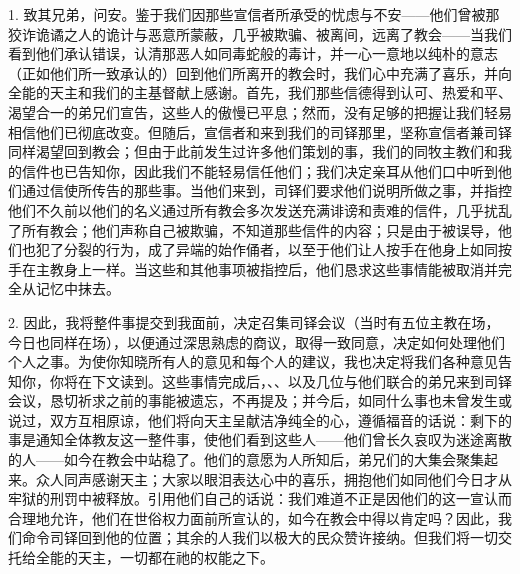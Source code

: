 \par

1. 致其兄弟，问安。鉴于我们因那些宣信者所承受的忧虑与不安——他们曾被那狡诈诡谲之人的诡计与恶意所蒙蔽，几乎被欺骗、被离间，远离了教会——当我们看到他们承认错误，认清那恶人如同毒蛇般的毒计，并一心一意地以纯朴的意志（正如他们所一致承认的）回到他们所离开的教会时，我们心中充满了喜乐，并向全能的天主和我们的主基督献上感谢。首先，我们那些信德得到认可、热爱和平、渴望合一的弟兄们宣告，这些人的傲慢已平息；然而，没有足够的把握让我们轻易相信他们已彻底改变。但随后，宣信者和来到我们的司铎那里，坚称宣信者兼司铎同样渴望回到教会；但由于此前发生过许多他们策划的事，我们的同牧主教们和我的信件也已告知你，因此我们不能轻易信任他们；我们决定亲耳从他们口中听到他们通过信使所传告的那些事。当他们来到，司铎们要求他们说明所做之事，并指控他们不久前以他们的名义通过所有教会多次发送充满诽谤和责难的信件，几乎扰乱了所有教会；他们声称自己被欺骗，不知道那些信件的内容；只是由于被误导，他们也犯了分裂的行为，成了异端的始作俑者，以至于他们让人按手在他身上如同按手在主教身上一样。当这些和其他事项被指控后，他们恳求这些事情能被取消并完全从记忆中抹去。\par

2. 因此，我将整件事提交到我面前，决定召集司铎会议（当时有五位主教在场，今日也同样在场），以便通过深思熟虑的商议，取得一致同意，决定如何处理他们个人之事。为使你知晓所有人的意见和每个人的建议，我也决定将我们各种意见告知你，你将在下文读到。这些事情完成后，、、以及几位与他们联合的弟兄来到司铎会议，恳切祈求之前的事能被遗忘，不再提及；并今后，如同什么事也未曾发生或说过，双方互相原谅，他们将向天主呈献洁净纯全的心，遵循福音的话说：剩下的事是通知全体教友这一整件事，使他们看到这些人——他们曾长久哀叹为迷途离散的人——如今在教会中站稳了。他们的意愿为人所知后，弟兄们的大集会聚集起来。众人同声感谢天主；大家以眼泪表达心中的喜乐，拥抱他们如同他们今日才从牢狱的刑罚中被释放。引用他们自己的话说：我们难道不正是因他们的这一宣认而合理地允许，他们在世俗权力面前所宣认的，如今在教会中得以肯定吗？因此，我们命令司铎回到他的位置；其余的人我们以极大的民众赞许接纳。但我们将一切交托给全能的天主，一切都在祂的权能之下。\par

